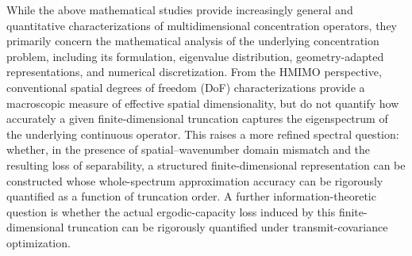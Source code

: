 \documentclass[lettersize,journal]{IEEEtran}
\theoremstyle{plain}
\begin{document}
While the above mathematical studies provide increasingly general and quantitative characterizations of multidimensional concentration operators, they primarily concern the mathematical analysis of the underlying concentration problem, including its formulation, eigenvalue distribution, geometry-adapted representations, and numerical discretization. 
From the HMIMO perspective, conventional spatial degrees of freedom (DoF) characterizations provide a macroscopic measure of effective spatial dimensionality, but do not quantify how accurately a given finite-dimensional truncation captures the eigenspectrum of the underlying continuous operator. This raises a more refined spectral question: whether, in the presence of spatial–wavenumber domain mismatch and the resulting loss of separability, a structured finite-dimensional representation can be constructed whose whole-spectrum approximation accuracy can be rigorously quantified as a function of truncation order.
A further information-theoretic question is whether the actual ergodic-capacity loss induced by this finite-dimensional truncation can be rigorously quantified under transmit-covariance optimization. 
\end{document}
